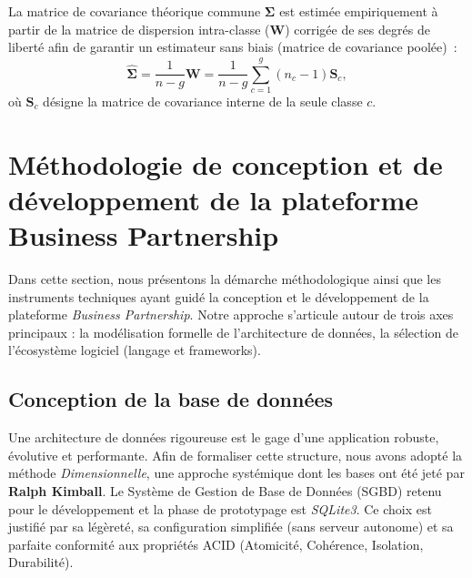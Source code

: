 \documentclass[12pt, a4paper, oneside]{report}
\begin{document}
	La matrice de covariance théorique commune $\boldsymbol{\Sigma}$ est estimée empiriquement à partir de la matrice de dispersion intra-classe ($\mathbf{W}$) corrigée de ses degrés de liberté afin de garantir un estimateur sans biais (matrice de covariance poolée)~:
	\begin{equation}
		\hat{\boldsymbol{\Sigma}} = \frac{1}{n - g} \mathbf{W} = \frac{1}{n - g} \sum_{c=1}^{g} (n_c - 1) \mathbf{S}_c,
		\label{eq:sigma_estime}
	\end{equation}
	où $\mathbf{S}_c$ désigne la matrice de covariance interne de la seule classe $c$.
	
	
	
\section{Méthodologie de conception et de développement de la plateforme Business Partnership}
\label{sec:methodologie_dev}
Dans cette section, nous présentons la démarche méthodologique ainsi que les instruments techniques ayant guidé la conception et le développement de la plateforme \textit{Business Partnership}. Notre approche s'articule autour de trois axes principaux : la modélisation formelle de l'architecture de données, la sélection de l'écosystème logiciel (langage et frameworks).

\subsection{Conception de la base de données}
Une architecture de données rigoureuse est le gage d'une application robuste, évolutive et performante. Afin de formaliser cette structure, nous avons adopté la méthode \textit{Dimensionnelle}, une approche systémique dont les bases ont été jeté par \textbf{Ralph Kimball}\cite{kimball2002toolkit}. Le Système de Gestion de Base de Données (SGBD) retenu pour le développement et la phase de prototypage est \textit{SQLite3}. Ce choix est justifié par sa légèreté, sa configuration simplifiée (sans serveur autonome) et sa parfaite conformité aux propriétés ACID (Atomicité, Cohérence, Isolation, Durabilité).
\end{document}
